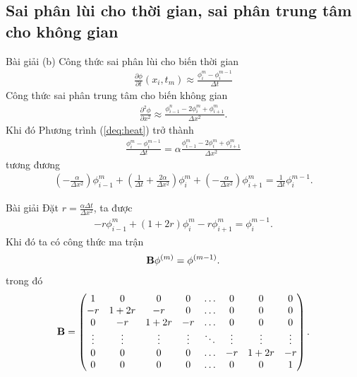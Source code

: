 \documentclass[9pt]{beamer}
\numberwithin{equation}{section}
\begin{document}
\subsection{Sai phân lùi cho thời gian, sai phân trung tâm cho không gian}

\begin{frame}
\begin{exampleblock}{Bài giải}
    (b) Công thức sai phân lùi cho biến thời gian
    \begin{align*}
        \frac{\partial \phi}{\partial t}(x_i, t_m)
        \approx \frac{\phi_i^m - \phi_i^{m-1}}{\Delta t}
    \end{align*}
    Công thức sai phân trung tâm cho biến không gian
    \begin{align*}
        \frac{\partial^2 \phi}{\partial x^2}
        \approx \frac{\phi_{i-1}^n - 2\phi_i^m + \phi_{i+1}^m}{\Delta x^2}.
    \end{align*}
    Khi đó Phương trình (\ref{deq:heat}) trở thành
    \begin{align*}
        \frac{\phi_i^m - \phi_i^{m-1}}{\Delta t} =
        \alpha \frac{\phi_{i-1}^m - 2\phi_i^m + \phi_{i+1}^m}{\Delta x^2}
    \end{align*}
    tương đương
    \begin{align*}
        \left(-\frac{\alpha}{\Delta x^2}\right) \phi_{i-1}^m +
        \left(\frac{1}{\Delta t} + \frac{2\alpha}{\Delta x^2}\right) \phi_i^m +
        \left(-\frac{\alpha}{\Delta x^2}\right) \phi_{i+1}^m =
        \frac{1}{\Delta t} \phi_i^{m-1}.
    \end{align*}
\end{exampleblock}
\end{frame}

\begin{frame}
\begin{exampleblock}{Bài giải}
    Đặt $r = \frac{\alpha \Delta t}{\Delta x^2}$, ta được
    \begin{align}
        -r\phi_{i-1}^m + (1 + 2r)\phi_i^m - r\phi_{i+1}^m = \phi_i^{m-1}. \label{deq:heat:btcs}
    \end{align}
    Khi đó ta có công thức ma trận
    \begin{align*}
        {\bf B}\phi^{(m)} = \phi^{(m-1)}.
    \end{align*}
    trong đó
    \begin{align*}
        {\bf B} = \begin{pmatrix}
        1 & 0 & 0 & 0 & \ldots & 0 & 0 & 0 \\
        -r & 1+2r & -r & 0 & \ldots & 0 & 0 & 0 \\
        0 & -r & 1+2r & -r & \ldots & 0 & 0 & 0 \\
        \vdots & \vdots & \vdots & \vdots & \ddots & \vdots & \vdots & \vdots \\
        0 & 0 & 0 & 0 & \ldots & -r & 1+2r & -r \\
        0 & 0 & 0 & 0 & \ldots & 0 & 0 & 1 
        \end{pmatrix}.
    \end{align*}
\end{exampleblock}
\end{frame}
\end{document}
